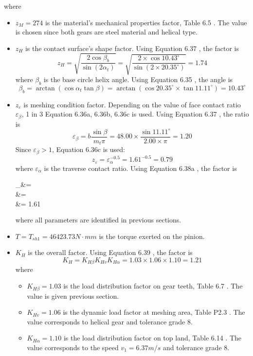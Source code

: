 where
\begin{itemize}
	\item $ z_M = 274 $ is the material's mechanical properties factor, Table 6.5 \cite{tk1}. The value is chosen since both gears are steel material and helical type.
	\item $ z_H $ is the contact surface's shape factor. Using Equation 6.37 \cite{tk1}, the factor is
	\[ z_H = \sqrt{\dfrac{2\cos\beta_b}{\sin(2\alpha_t)}} = \sqrt{\dfrac{2\times\cos 10.43^\circ}{\sin(2\times 20.35^\circ)}} = 1.74\]
	where $ \beta_b $ is the base circle helix angle. Using Equation 6.35 \cite{tk1}, the angle is
	\[ \beta_b = \arctan\left( \cos\alpha_t\tan\beta\right) = \arctan\left( \cos 20.35^\circ \times \tan 11.11^\circ\right) = 10.43^\circ\]
	\item $ z_\varepsilon $ is meshing condition factor. Depending on the value of face contact ratio $ \varepsilon_\beta $, 1 in 3 Equation 6.36a, 6.36b, 6.36c \cite{tk1} is used. Using Equation 6.37 \cite{tk1}, the ratio is
	\[\varepsilon_\beta = b\dfrac{\sin\beta}{m_t\pi} = 48.00\times\dfrac{\sin 11.11^\circ}{2.00\times\pi}=1.20\]
	Since $ \varepsilon_\beta >1 $, Equation 6.36c \cite{tk1} is used:
	\[z_\varepsilon = \varepsilon_\alpha^{-0.5} = 1.61^{-0.5} = 0.79\]	
	where $ \varepsilon_\alpha $ is the traverse contact ratio. Using Equation 6.38a \cite{tk1}, the factor is
	\begin{flalign*}
	\varepsilon_\alpha &= \\
	&= \\
	&= 1.61
	\end{flalign*}
	where all parameters are identified in previous sections.
	\item $ T=T_{sh1}=46423.73\unit{N\cdot mm} $ is the torque exerted on the pinion.
	\item $ K_H $ is the overall factor. Using Equation 6.39 \cite{tk1}, the factor is
	\[ K_H = K_{H\beta}K_{Hv}K_{H\alpha} = 1.03\times 1.06 \times 1.10  = 1.21\]
	where
	\begin{itemize}
		\item $ K_{H\beta} = 1.03 $ is the load distribution factor on gear teeth, Table 6.7 \cite{tk1}. The value is given previous section.
		\item $ K_{Hv} = 1.06 $ is the dynamic load factor at meshing area, Table P2.3 \cite{tk1}. The value corresponds to helical gear and tolerance grade 8.
		\item $ K_{H\alpha} = 1.10 $ is the load distribution factor on top land, Table 6.14 \cite{tk1}. The value corresponds to the speed $ v_1=6.37\unit{m/s} $ and tolerance grade 8.
	\end{itemize}
\end{itemize}



